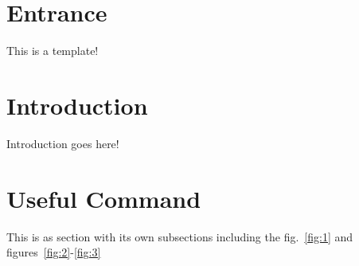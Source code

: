 \documentclass[12pt,oneside]{article}
\begin{document}
\isCUtitlefalse
{}
%
\toc

\section*{Entrance} \label{sec:entree}
This is a template!

\section{Introduction} \label{sec:intro}
Introduction goes here!
%
\section{Useful Command} \label{sec:useful}
This is as section with its own subsections including the fig.~\ref{fig:1} and \mbox{figures~\ref{fig:2}}-\ref{fig:3}
\end{document}
